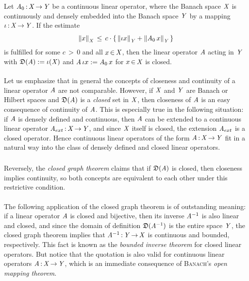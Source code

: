 \documentclass[11pt,twoside]{article}
\begin{document}
\begin{theorem}\label{BROWDER_THEOREM}
Let $\mathit{A}_0 {\,:\,} \mathit{X} {\,\to\,} \mathit{Y}$ be a continuous linear operator,
where the Banach space $\mathit{X}$ is continuously and densely embedded
into the Banach space $\mathit{Y}$ by a mapping $\iota {\,:\,} \mathit{X} {\,\to\,} \mathit{Y}$.
If the estimate
\begin{equation}\label{SCHAUDER_ESTIMATE}
\left\lVert x \right\rVert_{\mathit{X}} \, \leq \,
c \cdot
\{ \,\left\lVert \iota x \right\rVert_{\mathit{Y}} + \left\lVert \mathit{A}_0 \, x \right\rVert_{\mathit{Y}} \, \}
\end{equation}
is fulfilled for some $c {\,>\,} 0$ and all $x {\,\in\,} \mathit{X}$,
then the linear operator $\mathit{A}$ acting in $\mathit{Y}$ with
$\mathfrak{D}(\mathit{A}) := \iota(\mathit{X})$ and
$\mathit{A}\, \iota x := \mathit{A}_0 \, x$ for $x {\,\in\,} \mathit{X}$ is closed.
\end{theorem}

\paragraph{}
Let us emphasize that in general 
the concepts of closeness and continuity of a linear operator $\mathit{A}$
are not comparable.
However,
if $\mathit{X}$ and $\mathit{Y}$ are Banach or Hilbert spaces
and $\mathfrak{D}(\mathit{A})$ is a \textit{closed} set in $\mathit{X}$,
then closeness of $\mathit{A}$ is an easy consequence of continuity of $\mathit{A}$.
This is especially true in the following situation:
if $\mathit{A}$ is densely defined and continuous,
then $\mathit{A}$ can be extended to a continuous linear operator
$\mathit{A}_{ext} {\,:\,} \mathit{X} {\,\to\,} \mathit{Y}$,
and since $\mathit{X}$ itself is closed,
the extension $\mathit{A}_{ext}$ is a closed operator.
Hence continuous linear operators of the form $\mathit{A} {\,:\,} \mathit{X} {\,\to\,} \mathit{Y}$
fit in a natural way
into the class of densely defined and closed linear operators.

\subparagraph{} %
Reversely,
the \textit{closed graph theorem} claims that if $\mathfrak{D}(\mathit{A})$ is closed,
then closeness implies continuity,
so both concepts are equivalent to each other
under this restrictive condition.

\paragraph{} %
The following application of the closed graph theorem is of outstanding meaning:
if a linear operator $\mathit{A}$ is closed and bijective,
then its inverse $\mathit{A}^{-1}$ is also linear and closed,
and since the domain of definition $\mathfrak{D}(\mathit{A}^{-1})$
is the entire space $\mathit{Y}$,
the closed graph theorem implies that $\mathit{A}^{-1} {\,:\,} \mathit{Y} {\,\to\,} \mathit{X}$
is continuous and bounded,
respectively.
This fact is known as the \textit{bounded inverse theorem}
for closed linear operators.
But notice that the quotation is also valid for continuous linear operators
$\mathit{A} {\,:\,} \mathit{X} {\,\to\,} \mathit{Y}$,
which is an immediate consequence
of \textsc{Banach}'s \textit{open mapping theorem}.
\end{document}
